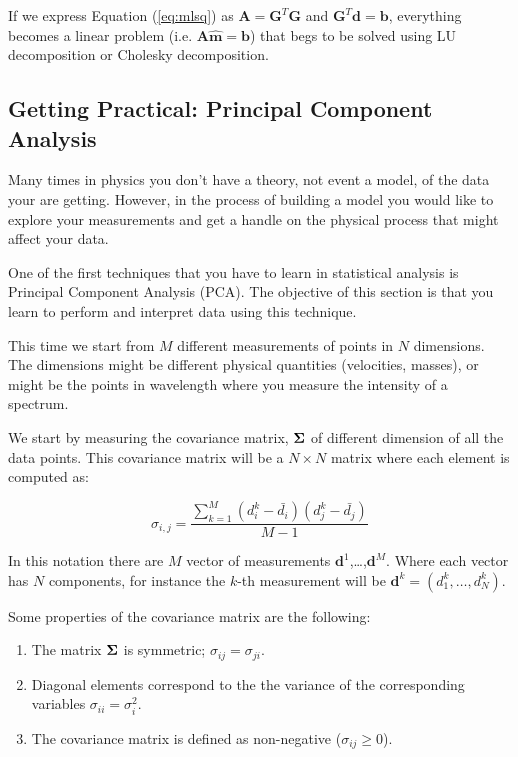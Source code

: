 \documentclass{article}
\begin{document}
If we express Equation (\ref{eq:mlsq}) as
$\mathbf{A}=\mathbf{G}^{T}\mathbf{G}$ and $\mathbf{G}^T\mathbf{d} =
\mathbf{b}$, everything becomes a linear problem
(i.e. $\mathbf{A}\hat{\mathbf{m}}=\mathbf{b}$) that begs to be
solved using LU decomposition or Cholesky decomposition.

\subsection{Getting Practical: Principal Component Analysis}

Many times in physics you don't have a theory, not event a model, of the data your are getting. However, in the process of building a model you would like to explore your measurements and get a handle on the physical process that might affect your data.

One of the first techniques that you have to learn in statistical analysis is Principal Component Analysis (PCA). The objective of this section is that you learn to perform and interpret data using this technique.

This time we start from $M$ different measurements of points in $N$ dimensions. The dimensions might be different physical quantities (velocities, masses), or might be the points in wavelength where you measure the intensity of a spectrum.

We start by measuring the covariance matrix, ${\bf\Sigma}$ of different dimension of all the data points. This covariance matrix will be a $N\times N$ matrix where each element is computed as:

\begin{equation}
\sigma_{i,j} = \frac{\sum_{k=1}^{M} (d^{k}_i - \bar{d_i})(d^{k}_j -\bar{d_{j}})}{M-1}
\end{equation}

In this notation there are $M$ vector of measurements ${\mathbf d}^{1}$,\ldots,${\mathbf d}^{M}$. Where each vector has $N$ components, for instance the $k$-th measurement will be ${\mathbf d}^{k}=(d^k_{1},\ldots,d^k_{N})$.

Some properties of the covariance matrix are the following:
\begin{enumerate}
\item The matrix ${\bf\Sigma}$ is symmetric;
  $\sigma_{ij}=\sigma_{ji}$.
\item Diagonal elements correspond to the the variance of the
  corresponding variables $\sigma_{ii}=\sigma_i^2$.
\item The covariance matrix is defined as non-negative
  ($\sigma_{ij}\geq 0$).
\end{enumerate}
\end{document}
